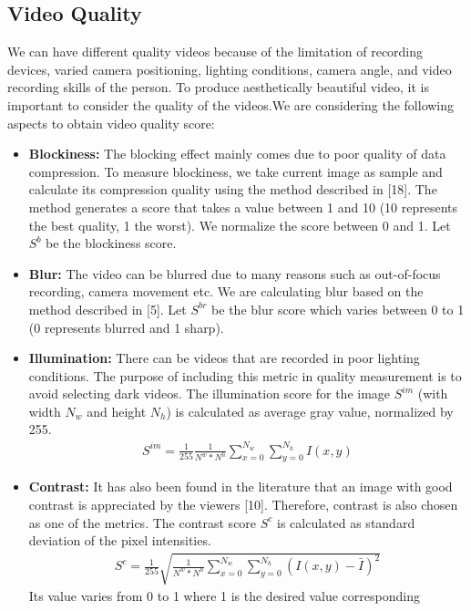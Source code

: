 \documentclass{sig-alternate-05-2015}
\begin{document}
\subsection{Video Quality}

We can have different quality videos because of the limitation of
recording devices, varied camera positioning, lighting conditions,
camera angle, and video recording skills of the person. To produce
aesthetically beautiful video, it is important to consider the quality
of the videos.We are considering the following aspects to obtain
video quality score:

\begin{itemize}
\item \textbf{Blockiness:}
The blocking effect mainly comes due to poor
quality of data compression. To measure blockiness, we take
current image as sample and calculate its compression quality
using the method described in [18]. The method generates
a score that takes a value between 1 and 10 (10 represents the
best quality, 1 the worst). We normalize the score between 0
and 1. Let $S^b$ be the blockiness score.
\item \textbf{Blur:}
The video can be blurred due to many reasons such as
out-of-focus recording, camera movement etc. We are calculating
blur based on the method described in [5]. Let $S^{br}$
be the blur score which varies between 0 to 1 (0 represents
blurred and 1 sharp).
\item \textbf{Illumination:}
There can be videos that are recorded in poor
lighting conditions. The purpose of including this metric in
quality measurement is to avoid selecting dark videos. The
illumination score for the image $S^{im}$ (with width $N_w$ and
height $N_h$) is calculated as average gray value, normalized
by 255.
\begin{eqnarray}
S^{im}=\frac{1}{255}\frac{1}{N^w*N^h}\sum^{N_w}_{x=0}\sum^{N_h}_{y=0}I(x,y)
\end{eqnarray}
\item \textbf{Contrast:}
It has also been found in the literature that an image
with good contrast is appreciated by the viewers [10].
Therefore, contrast is also chosen as one of the metrics. The
contrast score $S^c$ is calculated as standard deviation of the
pixel intensities.
\begin{eqnarray}
S^c=\frac{1}{255}\sqrt{\frac{1}{N^w*N^h}\sum^{N_w}_{x=0}\sum^{N_h}_{y=0}(I(x,y)-\bar{I})^2}
\end{eqnarray}
Its value varies from 0 to 1 where 1 is the desired value corresponding

\end{itemize}
\end{document}
